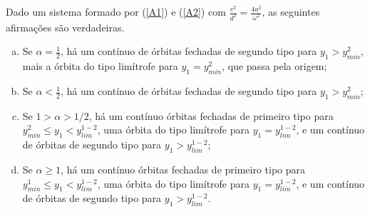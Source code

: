 \begin{proposition}
\label{prop}
Dado um sistema formado por (\ref{A1}) e (\ref{A2}) com $\frac{c^2}{d^2}=\frac{4a^2}{\omega^2}$, as seguintes afirmações são verdadeiras.
\begin{enumerate}[(a)]
\item Se $\alpha=\frac{1}{2}$, há um contínuo de órbitas fechadas de segundo tipo para $y_1>y_{min}^2$, mais a  órbita do tipo
limítrofe para $y_1=y_{min}^2$, que passa pela origem;
\item Se $\alpha<\frac{1}{2}$, há um contínuo de órbitas fechadas de segundo tipo para $y_1>y_{min}^2$;
\item Se $1>\alpha>1/2$, há um contínuo órbitas fechadas de primeiro tipo para $y_{min}^2\leq y_1<y_{lim}^{1-2}$, uma órbita do tipo limítrofe para $y_1=y_{lim}^{1-2}$, e um contínuo de órbitas de segundo tipo para $y_1>y_{lim}^{1-2}$;
\item Se $\alpha\geq1$, há um contínuo órbitas fechadas de primeiro tipo para $y_{min}^1\leq y_1<y_{lim}^{1-2}$, uma órbita do tipo limítrofe  para $y_1=y_{lim}^{1-2}$, e um contínuo de órbitas de segundo tipo para $y_1>y_{lim}^{1-2}$.
\end{enumerate}
\end{proposition}
